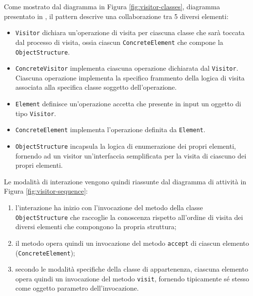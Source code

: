 Come mostrato dal diagramma in Figura \ref{fig:visitor-classes}, diagramma
presentato in \cite{gamma1995design}, il pattern descrive una collaborazione tra
5 diversi elementi:

\begin{itemize}

\item \texttt{Visitor} dichiara un'operazione di visita per ciascuna classe
che sarà toccata dal processo di visita, ossia ciascun
\texttt{ConcreteElement} che compone la \texttt{ObjectStructure}.

\item \texttt{ConcreteVisitor} implementa ciascuna operazione dichiarata dal
\texttt{Visitor}. Ciascuna operazione implementa la specifico frammento della
logica di visita associata alla specifica classe soggetto dell'operazione.

\item \texttt{Element} definisce un'operazione accetta che presente in input un
oggetto di tipo \texttt{Visitor}.

\item \texttt{ConcreteElement} implementa l'operazione definita da
\texttt{Element}.

\item \texttt{ObjectStructure} incapsula la logica di enumerazione dei propri
elementi, fornendo ad un visitor un'interfaccia semplificata per la visita di
ciascuno dei propri elementi.

\end{itemize}

Le modalità di interazione vengono quindi riassunte dal diagramma di attività
in Figura \ref{fig:visitor-sequence}:

\begin{enumerate}

\item l'interazione ha inizio con l'invocazione del metodo della classe
\texttt{ObjectStructure} che raccoglie la conoscenza rispetto all'ordine di
visita dei diversi elementi che compongono la propria struttura;

\item il metodo opera quindi un invocazione del metodo \texttt{accept} di
ciascun elemento (\texttt{ConcreteElement});

\item secondo le modalità specifiche della classe di appartenenza, ciascuna
elemento opera quindi un invocazione del metodo \texttt{visit}, fornendo
tipicamente sé stesso come oggetto parametro dell'invocazione.

\end{enumerate}

